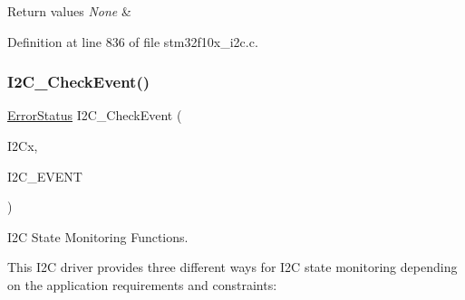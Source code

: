 \begin{DoxyRetVals}{Return values}
{\em None} & \\
\hline
\end{DoxyRetVals}


Definition at line 836 of file stm32f10x\+\_\+i2c.\+c.

\mbox{\label{group___i2_c___private___functions_ga2d5701342f9d4c1f09bf9d3cdcacc326}} 
\subsubsection{\texorpdfstring{I2\+C\+\_\+\+Check\+Event()}{I2C\_CheckEvent()}}
{\footnotesize\ttfamily \hyperlink{group___exported__types_ga8333b96c67f83cba354b3407fcbb6ee8}{Error\+Status} I2\+C\+\_\+\+Check\+Event (\begin{DoxyParamCaption}\item[{\hyperlink{struct_i2_c___type_def}{I2\+C\+\_\+\+Type\+Def} $\ast$}]{I2\+Cx,  }\item[{uint32\+\_\+t}]{I2\+C\+\_\+\+E\+V\+E\+NT }\end{DoxyParamCaption})}



I2C State Monitoring Functions. 

This I2C driver provides three different ways for I2C state monitoring depending on the application requirements and constraints\+:

